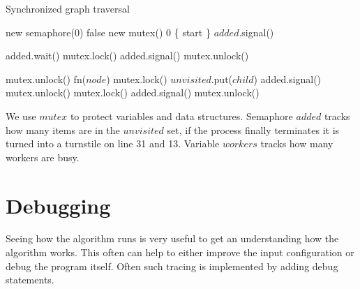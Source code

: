 \begin{algorithm}[H]
    \caption{Synchronized graph traversal}
\begin{algorithmic}[1]

             {new semaphore(0)}
         {false}
             {new mutex()}
           {0}
         {\{ start \}}
        \State $added$.signal()
        
        \Spawn
                \State added.wait()
                \State mutex.lock()
                    \State added.signal()
                    \State mutex.unlock()
                \EndIf

                \State mutex.unlock()
                \Statex
                \State fn($node$)
                \Statex
                    \State mutex.lock()
                        \State $unvisited$.put($child$)
                        \State added.signal()
                    \EndIf
                    \State mutex.unlock()
                \EndFor
                \Statex
                \State mutex.lock()
                    \State added.signal()
                \EndIf
                \State mutex.unlock()
            \EndWhile
        \EndSpawn

    \EndFunction
\end{algorithmic}
\end{algorithm}

We use $mutex$ to protect variables and data structures. Semaphore $added$ tracks how many items are in the $unvisited$ set, if the process finally terminates it is turned into a turnstile on line 31 and 13. Variable $workers$ tracks how many workers are busy.

\section{Debugging}

Seeing how the algorithm runs is very useful to get an understanding how the algorithm works. This often can help to either improve the input configuration or debug the program itself. Often such tracing is implemented by adding debug statements.

